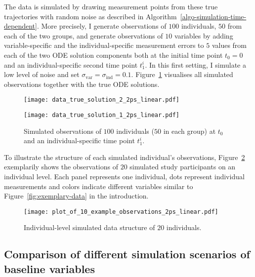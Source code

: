 The data is simulated by drawing measurement points from these true trajectories with random noise as described in Algorithm~\ref{algo-simulation-time-dependent}. More precisely, I generate observations of $100$ individuals, $50$ from each of the two groups, and generate observations of $10$ variables by adding variable-specific and the individual-specific measurement errors to $5$ values from each of the two ODE solution components both at the initial time point $t_0 = 0$ and an individual-specific second time point $t_1^i$. In this first setting, I simulate a low level of noise and set $\sigma_{\mathrm{var}} = \sigma_{\mathrm{ind}} = 0.1$. Figure~\ref{fig:data_truesolution_linear2ps} visualises all simulated observations together with the true ODE solutions.
\begin{figure}
	\centering
	\begin{minipage}{.5\linewidth}
		\centering
		\texttt{[image: data\_true\_solution\_2\_2ps\_linear.pdf]}
	\end{minipage}\begin{minipage}{.5\linewidth}
		\centering
		\texttt{[image: data\_true\_solution\_1\_2ps\_linear.pdf]}
	\end{minipage}
	\caption{Simulated observations of $100$ individuals ($50$ in each group) at $t_0$ and an individual-specific time point $t_1^i$.}
	\label{fig:data_truesolution_linear2ps}
\end{figure}
To illustrate the structure of each simulated individual's observations, Figure~\ref{fig:20example-ovservations_2ps_linear} exemplarily shows the observations of $20$ simulated study participants on an individual level. Each panel represents one individual, dots represent individual measurements and colors indicate different variables similar to Figure~\ref{fig:exemplary-data} in the introduction. 
\begin{figure}
	\texttt{[image: plot\_of\_10\_example\_observations\_2ps\_linear.pdf]}
	\caption{Individual-level simulated data structure of $20$ individuals.}
	\label{fig:20example-ovservations_2ps_linear}
\end{figure}

\subsection{Comparison of different simulation scenarios of baseline variables}\label{sec:apps-linear2p-comparisonbaseline}

